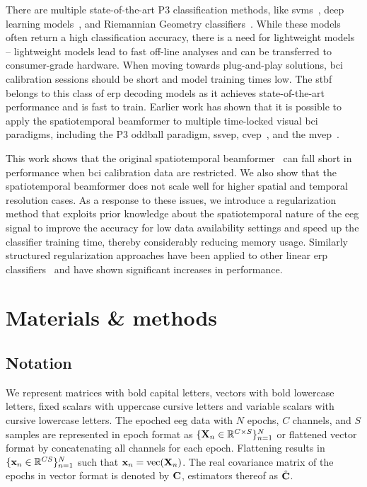   There are multiple state-of-the-art P3 classification methods, like
  \acp{svm}~\cite{Tayeb2014}, deep
	learning models~\cite{Vareka2020,Borra2020}, and Riemannian Geometry
	classifiers~\cite{Barachant2014}.
	While these models often return a high classification accuracy, there is a need
	for lightweight models -- lightweight models lead to fast off-line analyses and can be transferred to consumer-grade hardware.
	When moving towards plug-and-play solutions, \ac{bci} calibration sessions should be short and model training times low.
  The \ac{stbf}~\cite{VanVliet2015, Wittevrongel2016} belongs to
	this class of \ac{erp} decoding models as it achieves state-of-the-art performance and is fast to train.
	Earlier work has shown that it is
	possible to apply the spatiotemporal beamformer to multiple time-locked visual
  \ac{bci} paradigms, including the P3 oddball paradigm, \ac{ssvep},
  \ac{cvep}~\cite{Wittevrongel2017a}, and the \ac{mvep}~\cite{Libert2021}.

	This work shows that the original spatiotemporal
	beamformer~\cite{Wittevrongel2016} can fall short in performance when \ac{bci}
	calibration data are restricted.
	We also show that the spatiotemporal beamformer does not scale well for
	higher spatial and temporal resolution cases.
	As a response to these issues, we introduce a regularization method that
	exploits prior knowledge about the spatiotemporal nature of the \ac{eeg} signal to
	improve the accuracy for low data availability settings and speed up the
	classifier training time, thereby considerably reducing memory usage.
	Similarly structured regularization approaches have been applied to other linear
	\ac{erp} classifiers~\cite{GonzalezNavarro2017, Vliet2020} and have shown
	significant increases in performance.

	\section{Materials \& methods}
	\subsection{Notation}
	We represent matrices with bold capital letters, vectors with bold
	lowercase letters, fixed scalars with uppercase cursive letters and variable
  scalars with cursive lowercase letters.
	The epoched \ac{eeg} data with $N$ epochs, $C$ channels, and $S$ samples are
  represented in epoch format as $\{\mathbf{X}_n\in\mathbb{R}^{C\times S}\}^N_{n=1}$
  or flattened vector format by concatenating all channels for each epoch.
	Flattening results in $\{\mathbf{x}_n\in\mathbb{R}^{CS}\}^N_{n=1}$ such that
  $\mathbf{x}_n = \text{vec}(\mathbf{X}_n)$.
	The real covariance matrix of the epochs in vector format is
  denoted by $\mathbf{C}$, estimators thereof as $\hat{\mathbf{C}}$.

